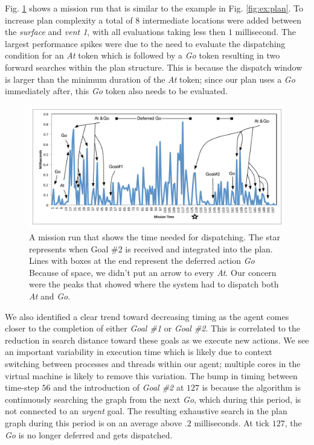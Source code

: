 Fig. \ref{fig:example_run} shows a mission run that is similar to the
example in Fig. \ref{fig:ex:plan}.  To increase plan complexity a
total of $8$ intermediate locations were added between the {\em
  surface} and {\em vent 1}, with all evaluations taking less then $1$
millisecond. The largest performance spikes were due to the need to
evaluate the dispatching condition for an {\em At} token which is
followed by a {\em Go} token resulting in two forward searches within
the plan structure. This is because the dispatch window is larger than
the minimum duration of the {\em At} token; since our plan uses a {\em
  Go} immediately after, this \emph{Go} token also needs to be
evaluated.

\begin{figure}[t]
  \centering
  \vskip-3mm
  \includegraphics[width=1.2\columnwidth]{figs/example_run.pdf}
  \vskip-2mm
  \caption{\small A mission run that shows the time needed for
    dispatching. The star represents when Goal \#2 is received and
    integrated into the plan. Lines with boxes at the end represent
    the deferred action {\em Go} Because of space, we didn't put an
    arrow to every {\em At}. Our concern were the peaks that showed
    where the system had to dispatch both {\em At} and {\em Go}. }
  \label{fig:example_run}
  \vskip-2mm
\end{figure}


We also identified a clear trend toward decreasing timing as the agent
comes closer to the completion of either {\em Goal \#1} or {\em Goal
  \#2}. This is correlated to the reduction in search distance toward
these goals as we execute new actions.  We see an important
variability in execution time which is likely due to context switching
between processes and threads within our agent; multiple cores in the
virtual machine is likely to remove this variation.  The bump in
timing between time-step $56$ and the introduction of {\em Goal \#2}
at $127$ is because the algorithm is continuously searching the graph
from the next {\em Go}, which during this period, is not connected to
an {\em urgent} goal. The resulting exhaustive search in the plan
graph during this period is on an average above $.2$ milliseconds. At
tick $127$, the {\em Go} is no longer deferred and gets dispatched.

